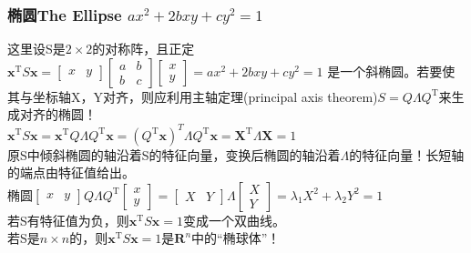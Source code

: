 \documentclass[UTF8]{article}
\begin{document}
    \subsubsection{椭圆The Ellipse $a x^{2}+2 b x y+c y^{2}=1$}
    这里设S是$2\times 2$的对称阵，且正定\\
    $\boldsymbol{x}^{\mathrm{T}} S \boldsymbol{x}=\left[\begin{array}{ll}{x} & {y}\end{array}\right]\left[\begin{array}{ll}{a} & {b} \\ {b} & {c}\end{array}\right]\left[\begin{array}{l}{x} \\ {y}\end{array}\right]=a x^{2}+2 b x y+c y^{2}=1$
    是一个斜椭圆。若要使其与坐标轴X，Y对齐，则应利用主轴定理(principal axis theorem)$S=Q \Lambda Q^{\mathrm{T}}$来生成对齐的椭圆！\\
    $\boldsymbol{x}^{\mathrm{T}} S \boldsymbol{x} = \boldsymbol{x}^{\mathrm{T}}Q \Lambda Q^{\mathrm{T}}\boldsymbol{x}= (Q^{\mathrm{T}}\boldsymbol{x})^{T}\Lambda Q^{\mathrm{T}}\boldsymbol{x}=\boldsymbol{X}^{\mathrm{T}} \Lambda \boldsymbol{X}=1$\\
    原S中倾斜椭圆的轴沿着S的特征向量，变换后椭圆的轴沿着$\Lambda$的特征向量！长短轴的端点由特征值给出。
    \\
    椭圆$\left[\begin{array}{ll}{x} & {y}\end{array}\right] Q \Lambda Q^{\mathrm{T}}\left[\begin{array}{l}{x} \\ {y}\end{array}\right]=\left[\begin{array}{ll}{X} & {Y}\end{array}\right] \Lambda\left[\begin{array}{l}{X} \\ {Y}\end{array}\right]=\lambda_{1} X^{2}+\lambda_{2} Y^{2}=1$
    \\
    若S有特征值为负，则$\boldsymbol{x}^{\mathrm{T}} S \boldsymbol{x}=1$变成一个双曲线。\\
    若S是$n \times n$的，则$\boldsymbol{x}^{\mathrm{T}} S \boldsymbol{x}=1$是$\mathbf{R}^{n}$中的“椭球体”！
    
\end{document}
